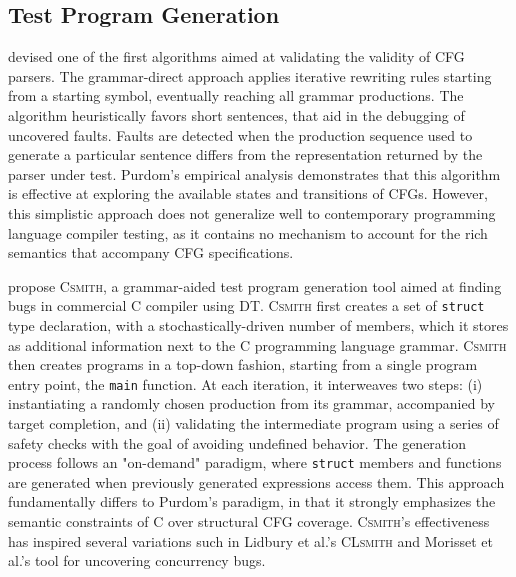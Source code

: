 \subsection{\label{subsec:tpg}Test Program Generation}

\citet{purdom1972sentence} devised one of the first algorithms aimed at
validating the validity of \gls{CFG} parsers.
The grammar-direct approach applies iterative rewriting rules
starting from a starting symbol, eventually reaching all grammar productions.
The algorithm heuristically favors short sentences, that aid in the
debugging of uncovered faults.
Faults are detected when the production sequence used to generate a particular
sentence differs from the representation returned by the parser under test.
Purdom's \cite{purdom1972sentence} empirical analysis demonstrates
that this algorithm is effective at exploring the available
states and transitions of \gls{CFG}s.
However, this simplistic approach does not generalize
well to contemporary programming language compiler testing,
as it contains no mechanism to account for the rich semantics
that accompany \gls{CFG} specifications.

\citet{yang2011finding} propose \textsc{Csmith}, a grammar-aided
test program generation tool aimed at finding bugs in commercial 
C compiler using \gls{DT}.
\textsc{Csmith} first creates a set of \texttt{struct} type
declaration, with a stochastically-driven  number of members, which 
it stores as additional information next to the C programming language grammar.
\textsc{Csmith} then creates programs in a top-down fashion, starting from a
single program entry point, the \texttt{main} function.
At each iteration, it interweaves two steps: (i) instantiating
a randomly chosen production from its grammar, accompanied
by target completion, and (ii) validating the intermediate program
using a series of safety checks with the goal of avoiding undefined behavior.
The generation process follows an "on-demand" paradigm, where \texttt{struct}
members and functions are generated when previously generated expressions
access them.
This approach fundamentally differs to Purdom's \cite{purdom1972sentence} paradigm,
in that it strongly emphasizes the semantic constraints of C over 
structural \gls{CFG} coverage.
\textsc{Csmith}'s effectiveness has inspired several variations such in
Lidbury et al.'s \textsc{CLsmith} \cite{lidbury2015many} and
Morisset et al.'s \cite{morisset2013compiler} tool for uncovering
concurrency bugs.

